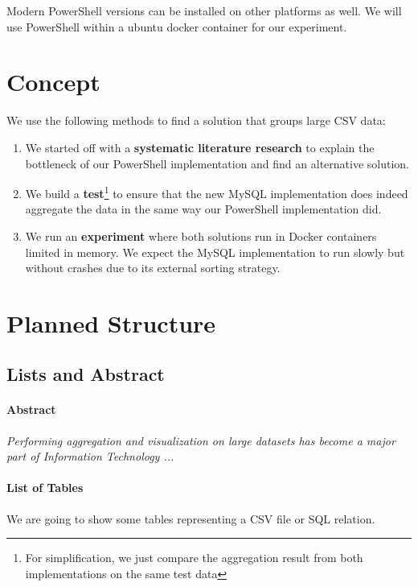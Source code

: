 \documentclass[12pt,letterpaper]{article} %
\begin{document}
Modern PowerShell versions can be installed on other platforms as well. We will
use PowerShell within a ubuntu docker container for our experiment.

\section{Concept}

We use the following methods to find a solution that groups large CSV data:

\begin{enumerate} \label{Methods}
    \item We started off with a \textbf{systematic literature research}
        to explain the bottleneck of our PowerShell implementation
        and find an alternative solution.
    \item We build a \textbf{test}\footnote{For simplification,
        we just compare the aggregation result from both
        implementations on the same test data} to ensure that the new
        MySQL implementation does indeed aggregate the data in the same way
        our PowerShell implementation did.
    \item We run an \textbf{experiment} where both solutions run in
        Docker containers limited in memory. We expect the MySQL implementation
        to run slowly but without crashes due to its external sorting
        strategy.
\end{enumerate}

\section{Planned Structure}

\subsection{Lists and Abstract}

\paragraph{Abstract}
\textit{Performing aggregation and visualization on large datasets
has become a major part of Information Technology ...}

\paragraph{List of Tables}
We are going to show some tables representing a CSV file or SQL relation.
\end{document}
